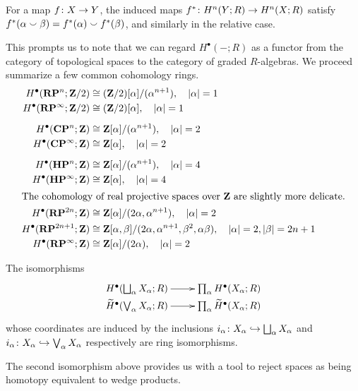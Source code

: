 \begin{proposition}
  For a map $f \colon X \rightarrow Y$, the induced maps $f^\ast \colon H^n(Y;R) \rightarrow H^n(X;R)$ satisfy $f^\ast(\alpha \smallsmile \beta) = f^\ast(\alpha) \smallsmile f^\ast(\beta)$, and similarly in the relative case.
\end{proposition}

This prompts us to note that we can regard $H^\bullet(-;R)$ as a functor from the category of topological spaces to the category of graded $R$-algebras. We proceed summarize a few common cohomology rings.
\begin{align*}
  H^\bullet(\mathbf{R}\mathbf{P}^n;\mathbf{Z}/2) &\cong (\mathbf{Z}/2)[\alpha]/(\alpha^{n+1}), \quad |\alpha| = 1\\
  H^\bullet(\mathbf{R}\mathbf{P}^\infty;\mathbf{Z}/2) &\cong (\mathbf{Z}/2)[\alpha], \quad |\alpha| = 1 \\[5pt]
  H^\bullet(\mathbf{C}\mathbf{P}^n;\mathbf{Z}) &\cong \mathbf{Z}[\alpha]/(\alpha^{n+1}), \quad |\alpha| = 2 \\
  H^\bullet(\mathbf{C}\mathbf{P}^\infty;\mathbf{Z}) &\cong \mathbf{Z}[\alpha], \quad |\alpha| = 2 \\[5pt]
  H^\bullet(\mathbf{H}\mathbf{P}^n;\mathbf{Z}) &\cong \mathbf{Z}[\alpha]/(\alpha^{n+1}), \quad |\alpha| = 4 \\
  H^\bullet(\mathbf{H}\mathbf{P}^\infty;\mathbf{Z}) &\cong \mathbf{Z}[\alpha], \quad |\alpha| = 4 \\
  \intertext{The cohomology of real projective spaces over $\mathbf{Z}$ are slightly more delicate.}
  H^\bullet(\mathbf{R}\mathbf{P}^{2n};\mathbf{Z}) &\cong \mathbf{Z}[\alpha]/(2\alpha,\alpha^{n+1}), \quad |\alpha| = 2 \\
  H^\bullet(\mathbf{R}\mathbf{P}^{2n+1};\mathbf{Z}) &\cong \mathbf{Z}[\alpha,\beta]/(2\alpha,\alpha^{n+1},\beta^2,\alpha\beta), \quad |\alpha| = 2, |\beta| = 2n+1 \\
  H^\bullet(\mathbf{R}\mathbf{P}^\infty;\mathbf{Z}) &\cong \mathbf{Z}[\alpha]/(2\alpha), \quad |\alpha| = 2
\end{align*}

\begin{proposition}
  The isomorphisms
  \[\xymatrix@R=0in{
    H^\bullet(\bigsqcup_\alpha X_\alpha;R) \ar[r] & \prod_\alpha H^\bullet(X_\alpha;R) \\
    \wtilde{H}^\bullet(\bigvee_\alpha X_\alpha;R) \ar[r] & \prod_\alpha \wtilde{H}^\bullet(X_\alpha;R)
  }\]
  whose coordinates are induced by the inclusions $i_\alpha \colon X_\alpha \hookrightarrow \bigsqcup_\alpha X_\alpha$ and $i_\alpha \colon X_\alpha \hookrightarrow \bigvee_\alpha X_\alpha$ respectively are ring isomorphisms.
\end{proposition}

The second isomorphism above provides us with a tool to reject spaces as being homotopy equivalent to wedge products.

